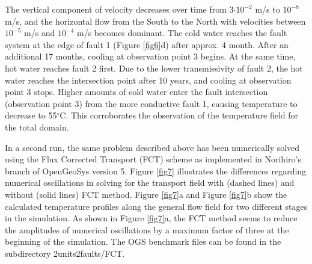 The vertical component of velocity decreases over time from 3$\cdot10^{-2}$ m/s to $10^{-8}$ m/s, and the horizontal flow from the South to the North with velocities between $10^{-5}$ m/s and $10^{-4}$ m/s becomes dominant. The cold water reaches the fault system at the edge of fault 1 (Figure \ref{fig6}d) after approx. 4 month. After an additional 17 months, cooling at observation point 3 begins. At the same time, hot water reaches fault 2 first. Due to the lower transmissivity of fault 2, the hot water reaches the intersection point after 10 years, and cooling at observation point 3 stops. Higher amounts of cold water enter the fault intersection (observation point 3) from the more conductive fault 1, causing temperature to decrease to 55$^\circ{}$C. This corroborates the observation of the temperature field for the total domain.

In a second run, the same problem described above has been numerically solved using the Flux Corrected Transport (FCT) scheme as implemented in Norihiro's branch of OpenGeoSys version 5. Figure \ref{fig7} illustrates the differences regarding numerical oscillations in solving for the transport field with (dashed lines) and without (solid lines) FCT method. Figure \ref{fig7}a and Figure \ref{fig7}b show the calculated temperature profiles along the general flow field for two different stages in the simulation. As shown in Figure \ref{fig7}a, the FCT method seems to reduce the amplitudes of numerical oscillations by a maximum factor of three at the beginning of the simulation. The OGS benchmark files can be found in the subdirectory 2units2faults/FCT.
